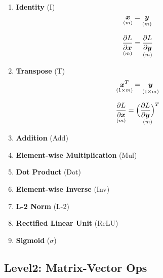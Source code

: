 \documentclass[9pt,twocolumn,times]{article}
\begin{document}
\begin{enumerate}[leftmargin=*]
\item \textbf{Identity} (I)
\begin{equation}
	\underset{(m)}{{\bm{x}}} = \underset{(m)}{{\bm{y}}}
\end{equation}
\begin{center}
	\resizebox{0.618\columnwidth}{!}{%
		
	}
\end{center}
\begin{equation}
	\underset{(m)}{\frac{\partial L}{\partial {\bm{x}}}} =
	\underset{(m)}{\frac{\partial L}{\partial {\bm{y}}}}
\end{equation}

\item \textbf{Transpose} (T)
\begin{equation}
	\underset{(1\times m)}{{\bm{x}}^T} = \underset{(1\times m)}{{\bm{y}}}
\end{equation}
\begin{center}
	\resizebox{0.618\columnwidth}{!}{%
		
	}
\end{center}
\begin{equation}
	\underset{(m)}{\frac{\partial L}{\partial {\bm{x}}}} =
	\underset{(m)}{\Big(\frac{\partial L}{\partial {\bm{y}}}\Big)^T}
\end{equation}

\item \textbf{Addition} (Add)

\item \textbf{Element-wise Multiplication} (Mul)

\item \textbf{Dot Product} (Dot)

\item \textbf{Element-wise Inverse} (Inv)

\item \textbf{L-2 Norm} (L-2)

\item \textbf{Rectified Linear Unit} (ReLU)

\item \textbf{Sigmoid} ($\sigma$)
\end{enumerate}

\subsection{Level2: Matrix-Vector Ops}
\end{document}
